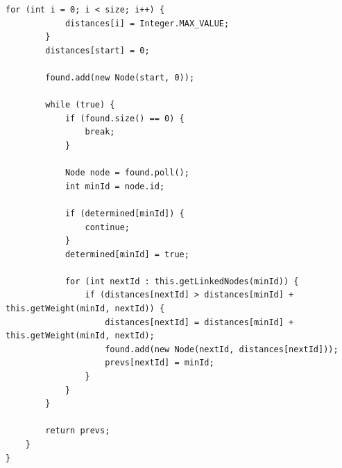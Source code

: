 \documentclass[a4j]{jarticle}
\begin{document}
\begin{lstlisting}[caption=MyGraph.java]
        for (int i = 0; i < size; i++) {
            distances[i] = Integer.MAX_VALUE;
        }
        distances[start] = 0;

        found.add(new Node(start, 0));

        while (true) {
            if (found.size() == 0) {
                break;
            }

            Node node = found.poll();
            int minId = node.id;
            
            if (determined[minId]) {
                continue;
            }
            determined[minId] = true;

            for (int nextId : this.getLinkedNodes(minId)) {
                if (distances[nextId] > distances[minId] + this.getWeight(minId, nextId)) {
                    distances[nextId] = distances[minId] + this.getWeight(minId, nextId);
                    found.add(new Node(nextId, distances[nextId]));
                    prevs[nextId] = minId;
                }
            }
        }

        return prevs;
    }
}
\end{lstlisting}
\end{document}
